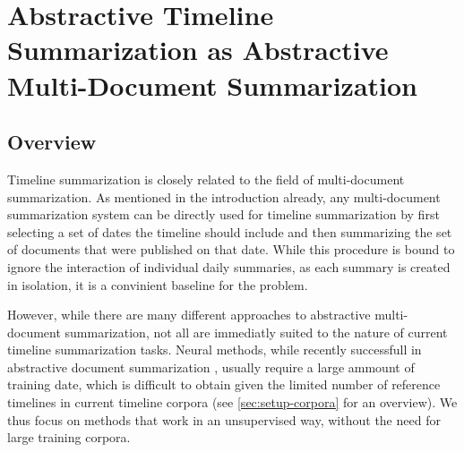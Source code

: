 \documentclass[a4paper,BCOR=10mm]{report}
\numberwithin{lemma}{chapter}
\numberwithin{definition}{chapter}
\begin{document}









\chapter{Abstractive Timeline Summarization as Abstractive Multi-Document Summarization} \label{sec:baseline}

\section{Overview}

Timeline summarization is closely related to the field of multi-document summarization. As mentioned in the introduction already, any multi-document summarization system can be directly used for timeline summarization by first selecting a set of dates the timeline should include and then summarizing the set of documents that were published on that date.
While this procedure is bound to ignore the interaction of individual daily summaries, as each summary is created in isolation, it is a convinient baseline for the problem.

However, while there are many different approaches to abstractive multi-document summarization, not all are immediatly suited to the nature of current timeline summarization tasks. Neural methods, while recently successfull in abstractive document summarization \citep{paulus}, usually require a large ammount of training date, which is difficult to obtain given the limited number of reference timelines in current timeline corpora (see \ref{sec:setup-corpora} for an overview).
We thus focus on methods that work in an unsupervised way, without the need for large training corpora.
\end{document}
